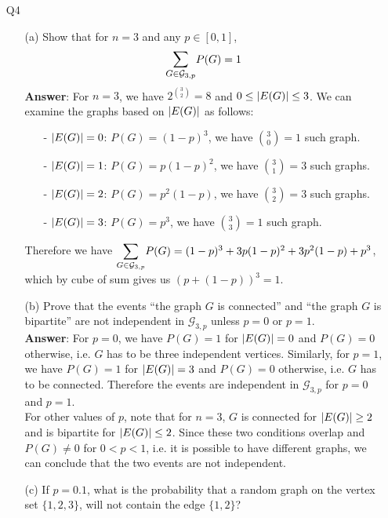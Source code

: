 \documentclass{article}
\begin{document}
\newpage
\begin{itemize}
      \item [Q4]
            \begin{itemize}
                  \item [(a)] Show that for $n=3$ and any $p\in[0,1]$, \[\mathlarger{\sum_{G\in\mathcal{G}_{3,p}}}P(G)=1\]
                        \textbf{Answer}: For $n=3$, we have $2^{\binom{3}{2}}=8$ and $0\leq\abs{E(G)}\leq 3$. We can examine the graphs based on $\abs{E(G)}$ as follows:
                        \begin{itemize}
                              \item [-] $\abs{E(G)}=0$: $P(G)=(1-p)^3$, we have $\binom{3}{0}=1$ such graph.
                              \item [-] $\abs{E(G)}=1$: $P(G)=p(1-p)^2$, we have $\binom{3}{1}=3$ such graphs.
                              \item [-] $\abs{E(G)}=2$: $P(G)=p^2(1-p)$, we have $\binom{3}{2}=3$ such graphs.
                              \item [-] $\abs{E(G)}=3$: $P(G)=p^3$, we have $\binom{3}{3}=1$ such graph.
                        \end{itemize}
                        Therefore we have $\mathlarger{\sum_{G\in\mathcal{G}_{3,p}}}P(G)=(1-p)^3+3p(1-p)^2+3p^2(1-p)+p^3$, which by cube of sum gives us $(p+(1-p))^3=1$.
                  \item [(b)] Prove that the events ``the graph $G$ is connected'' and ``the graph $G$ is bipartite'' are not independent in $\mathcal{G}_{3,p}$ unless $p=0$ or $p=1$.\\
                        \textbf{Answer}: For $p=0$, we have $P(G)=1$ for $\abs{E(G)}=0$ and $P(G)=0$ otherwise, i.e. $G$ has to be three independent vertices. Similarly, for $p=1$, we have $P(G)=1$ for $\abs{E(G)}=3$ and $P(G)=0$ otherwise, i.e. $G$ has to be connected. Therefore the events are independent in $\mathcal{G}_{3,p}$ for $p=0$ and $p=1$.\\
                        For other values of $p$, note that for $n=3$, $G$ is connected for $\abs{E(G)}\geq 2$ and is bipartite for $\abs{E(G)}\leq 2$. Since these two conditions overlap and $P(G)\neq 0$ for $0<p<1$, i.e. it is possible to have different graphs, we can conclude that the two events are not independent.
                  \item [(c)] If $p=0.1$, what is the probability that a random graph on the vertex set $\{1,2,3\}$, will not contain the edge $\{1,2\}$?\\

\end{itemize}
\end{itemize}
\end{document}
